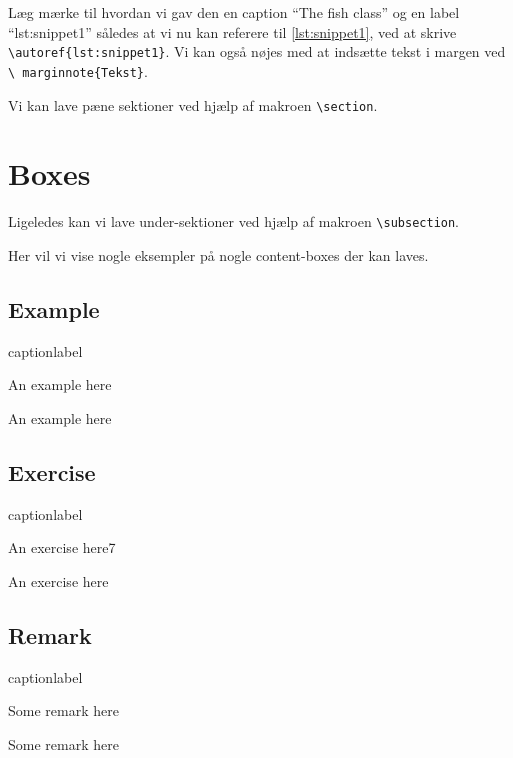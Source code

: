 Læg mærke til hvordan vi gav den en caption ``The fish class'' og en label 
``lst:snippet1'' således at vi nu kan referere til \autoref{lst:snippet1}, ved 
at skrive \texttt{\textbackslash autoref\{lst:snippet1\}}.
\vspace{2mm}
Vi kan også nøjes med at indsætte tekst i margen ved \texttt{\textbackslash 
	marginnote\{Tekst\}}.


Vi kan lave pæne sektioner ved hjælp af makroen \texttt{\textbackslash section}.

\section{Boxes}
Ligeledes kan vi lave under-sektioner ved hjælp af makroen 
\texttt{\textbackslash subsection}.

Her vil vi vise nogle eksempler på nogle content-boxes der kan laves.
\begin{samepage}
	\subsection{Example}
	\begin{LaTeXCode}{caption}{label}
	\begin{example}
		An example here
	\end{example}
	\end{LaTeXCode}
	\begin{example}
		An example here
	\end{example}
\end{samepage}

\subsection{Exercise}
\begin{LaTeXCode}{caption}{label}
\begin{exercise}
	An exercise here7
\end{exercise}
\end{LaTeXCode}
\begin{exercise}
	An exercise here
\end{exercise}

\subsection{Remark}
\begin{LaTeXCode}{caption}{label}
\begin{remark}
	Some remark here
\end{remark}
\end{LaTeXCode}
\begin{remark}
	Some remark here
\end{remark}

